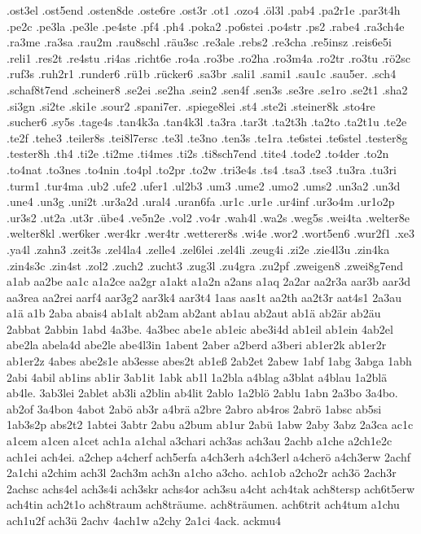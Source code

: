 {.ost3el
.ost5end
.osten8de
.oste6re
.ost3r
.ot1
.ozo4
.öl3l
.pab4
.pa2r1e
.par3t4h
.pe2c
.pe3la
.pe3le
.pe4ste
.pf4
.ph4
.poka2
.po6stei
.po4str
.ps2
.rabe4
.ra3ch4e
.ra3me
.ra3sa
.rau2m
.rau8schl
.räu3sc
.re3ale
.rebs2
.re3cha
.re5insz
.reis6e5i
.reli1
.res2t
.re4stu
.ri4as
.richt6e
.ro4a
.ro3be
.ro2ha
.ro3m4a
.ro2tr
.ro3tu
.rö2sc
.ruf3s
.ruh2r1
.runder6
.rü1b
.rücker6
.sa3br
.sali1
.sami1
.sau1c
.sau5er.
.sch4
.schaf8t7end
.scheiner8
.se2ei
.se2ha
.sein2
.sen4f
.sen3s
.se3re
.se1ro
.se2t1
.sha2
.si3gn
.si2te
.ski1e
.sour2
.spani7er.
.spiege8lei
.st4
.ste2i
.steiner8k
.sto4re
.sucher6
.sy5s
.tage4s
.tan4k3a
.tan4k3l
.ta3ra
.tar3t
.ta2t3h
.ta2to
.ta2t1u
.te2e
.te2f
.tehe3
.teiler8s
.tei8l7ersc
.te3l
.te3no
.ten3s
.te1ra
.te6stei
.te6stel
.tester8g
.tester8h
.th4
.ti2e
.ti2me
.ti4mes
.ti2s
.ti8sch7end
.tite4
.tode2
.to4der
.to2n
.to4nat
.to3nes
.to4nin
.to4pl
.to2pr
.to2w
.tri3e4s
.ts4
.tsa3
.tse3
.tu3ra
.tu3ri
.turm1
.tur4ma
.ub2
.ufe2
.ufer1
.ul2b3
.um3
.ume2
.umo2
.ums2
.un3a2
.un3d
.une4
.un3g
.uni2t
.ur3a2d
.ural4
.uran6fa
.ur1c
.ur1e
.ur4inf
.ur3o4m
.ur1o2p
.ur3s2
.ut2a
.ut3r
.übe4
.ve5n2e
.vol2
.vo4r
.wah4l
.wa2s
.weg5s
.wei4ta
.welter8e
.welter8kl
.wer6ker
.wer4kr
.wer4tr
.wetterer8s
.wi4e
.wor2
.wort5en6
.wur2f1
.xe3
.ya4l
.zahn3
.zeit3s
.zel4la4
.zelle4
.zel6lei
.zel4li
.zeug4i
.zi2e
.zie4l3u
.zin4ka
.zin4s3c
.zin4st
.zol2
.zuch2
.zucht3
.zug3l
.zu4gra
.zu2pf
.zweigen8
.zwei8g7end
a1ab
aa2be
aa1c
a1a2ce
aa2gr
a1akt
a1a2n
a2ans
a1aq
2a2ar
aa2r3a
aar3b
aar3d
aa3rea
aa2rei
aarf4
aar3g2
aar3k4
aar3t4
1aas
aas1t
aa2th
aa2t3r
aat4s1
2a3au
a1ä
a1b
2aba
abais4
ab1alt
ab2am
ab2ant
ab1au
ab2aut
ab1ä
ab2är
ab2äu
2abbat
2abbin
1abd
4a3be.
4a3bec
abe1e
ab1eic
abe3i4d
ab1eil
ab1ein
4ab2el
abe2la
abela4d
abe2le
abe4l3in
1abent
2aber
a2berd
a3beri
ab1er2k
ab1er2r
ab1er2z
4abes
abe2s1e
ab3esse
abes2t
ab1eß
2ab2et
2abew
1abf
1abg
3abga
1abh
2abi
4abil
ab1ins
ab1ir
3ab1it
1abk
ab1l
1a2bla
a4blag
a3blat
a4blau
1a2blä
ab4le.
3ab3lei
2ablet
ab3li
a2blin
ab4lit
2ablo
1a2blö
2ablu
1abn
2a3bo
3a4bo.
ab2of
3a4bon
4abot
2abö
ab3r
a4brä
a2bre
2abro
ab4ros
2abrö
1absc
ab5si
1ab3s2p
abs2t2
1abtei
3abtr
2abu
a2bum
ab1ur
2abü
1abw
2aby
3abz
2a3ca
ac1c
a1cem
a1cen
a1cet
ach1a
a1chal
a3chari
ach3as
ach3au
2achb
a1che
a2ch1e2c
ach1ei
ach4ei.
a2chep
a4cherf
ach5erfa
a4ch3erh
a4ch3erl
a4cherö
a4ch3erw
2achf
2a1chi
a2chim
ach3l
2ach3m
ach3n
a1cho
a3cho.
ach1ob
a2cho2r
ach3ö
2ach3r
2achsc
achs4el
ach3s4i
ach3skr
achs4or
ach3su
a4cht
ach4tak
ach8tersp
ach6t5erw
ach4tin
ach2t1o
ach8traum
ach8träume.
ach8träumen.
ach6trit
ach4tum
a1chu
ach1u2f
ach3ü
2achv
4ach1w
a2chy
2a1ci
4ack.
ackmu4
}
